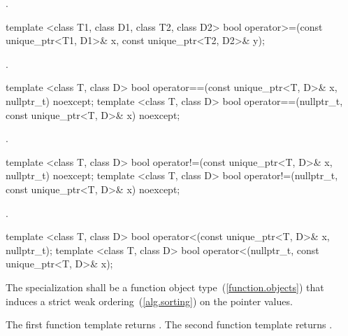 \begin{itemdescr}
\pnum
\returns {}.
\end{itemdescr}

%
\begin{itemdecl}
template <class T1, class D1, class T2, class D2>
  bool operator>=(const unique_ptr<T1, D1>& x, const unique_ptr<T2, D2>& y);
\end{itemdecl}

\begin{itemdescr}
\pnum
\returns {}.
\end{itemdescr}

%
\begin{itemdecl}
template <class T, class D>
  bool operator==(const unique_ptr<T, D>& x, nullptr_t) noexcept;
template <class T, class D>
  bool operator==(nullptr_t, const unique_ptr<T, D>& x) noexcept;
\end{itemdecl}

\begin{itemdescr}
\pnum
\returns {}.
\end{itemdescr}

%
\begin{itemdecl}
template <class T, class D>
  bool operator!=(const unique_ptr<T, D>& x, nullptr_t) noexcept;
template <class T, class D>
  bool operator!=(nullptr_t, const unique_ptr<T, D>& x) noexcept;
\end{itemdecl}

\begin{itemdescr}
\pnum
\returns {}.
\end{itemdescr}

%
\begin{itemdecl}
template <class T, class D>
  bool operator<(const unique_ptr<T, D>& x, nullptr_t);
template <class T, class D>
  bool operator<(nullptr_t, const unique_ptr<T, D>& x);
\end{itemdecl}

\begin{itemdescr}
\pnum
\requires The specialization  shall be
a function object type~(\ref{function.objects}) that induces a strict weak
ordering~(\ref{alg.sorting}) on the pointer values.

\pnum
\returns
The first function template returns
.
The second function template returns
.
\end{itemdescr}

